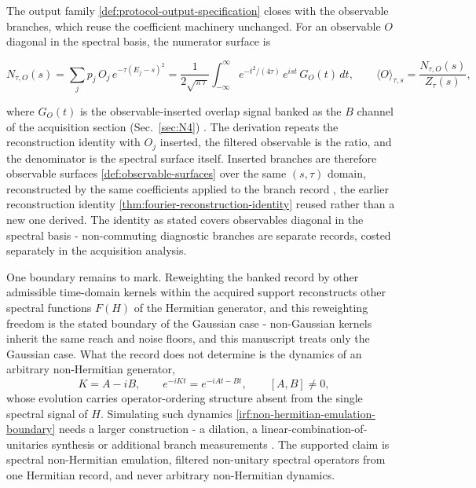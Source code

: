 The output family \eqref{def:protocol-output-specification} closes with the observable branches, which reuse the coefficient machinery unchanged. For an observable $O$ diagonal in the spectral basis, the numerator surface is
\begin{widetext}
\begin{equation}\label{def:observable-surfaces}
N_{\tau,O}(s)=\sum_j p_j\,O_j\,e^{-\tau(E_j-s)^{2}}=\frac{1}{2\sqrt{\pi\tau}}\int_{-\infty}^{\infty}e^{-t^{2}/(4\tau)}\,e^{ist}\,G_O(t)\,dt,\qquad \langle O\rangle_{\tau,s}=\frac{N_{\tau,O}(s)}{Z_\tau(s)},
\end{equation}
\end{widetext}
where $G_O(t)$ is the observable-inserted overlap signal banked as the $B$ channel of the acquisition section (Sec.~\ref{sec:N4}) \cite{knill1998power}. The derivation repeats the reconstruction identity with $O_j$ inserted, the filtered observable is the ratio, and the denominator is the spectral surface itself. Inserted branches are therefore observable surfaces \eqref{def:observable-surfaces} over the same $(s,\tau)$ domain, reconstructed by the same coefficients applied to the branch record \cite{chan2025shadow}, the earlier reconstruction identity \eqref{thm:fourier-reconstruction-identity} reused rather than a new one derived. The identity as stated covers observables diagonal in the spectral basis - non-commuting diagnostic branches are separate records, costed separately in the acquisition analysis.

One boundary remains to mark. Reweighting the banked record by other admissible time-domain kernels within the acquired support reconstructs other spectral functions $F(H)$ of the Hermitian generator, and this reweighting freedom is the stated boundary of the Gaussian case - non-Gaussian kernels inherit the same reach and noise floors, and this manuscript treats only the Gaussian case. What the record does not determine is the dynamics of an arbitrary non-Hermitian generator,
\begin{equation}\label{irf:non-hermitian-emulation-boundary}
K=A-iB,\qquad e^{-iKt}=e^{-iAt-Bt},\qquad [A,B]\neq 0,
\end{equation}
whose evolution carries operator-ordering structure absent from the single spectral signal of $H$. Simulating such dynamics \eqref{irf:non-hermitian-emulation-boundary} needs a larger construction - a dilation, a linear-combination-of-unitaries synthesis or additional branch measurements \cite{leamer2024emulation,kamakari2022digital}. The supported claim is spectral non-Hermitian emulation, filtered non-unitary spectral operators from one Hermitian record, and never arbitrary non-Hermitian dynamics.

